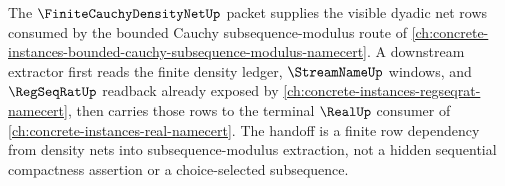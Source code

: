 The $\FiniteCauchyDensityNetUp$ packet supplies the visible dyadic net rows consumed by the bounded Cauchy subsequence-modulus route of \autoref{ch:concrete-instances-bounded-cauchy-subsequence-modulus-namecert}. A downstream extractor first reads the finite density ledger, $\StreamNameUp$ windows, and $\RegSeqRatUp$ readback already exposed by \autoref{ch:concrete-instances-regseqrat-namecert}, then carries those rows to the terminal $\RealUp$ consumer of \autoref{ch:concrete-instances-real-namecert}. The handoff is a finite row dependency from density nets into subsequence-modulus extraction, not a hidden sequential compactness assertion or a choice-selected subsequence.
